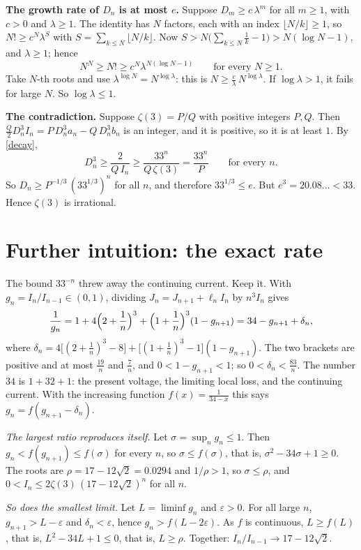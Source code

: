 \documentclass[11pt]{article}
\newcommand{\q}[1]{\medskip\noindent\textbf{#1}}
\begin{document}
\q{The growth rate of $D_n$ is at most $e$.} Suppose $D_m\ge c\,\lambda^m$ for all $m\ge1$, with
$c>0$ and $\lambda\ge1$. The identity has $N$ factors, each with an index $\lfloor N/k\rfloor\ge1$, so
$N!\ge c^N\lambda^{S}$ with $S=\sum_{k\le N}\lfloor N/k\rfloor$. Now
$S>N\bigl(\sum_{k\le N}\frac1k-1\bigr)>N(\log N-1)$, and $\lambda\ge1$; hence
\[
N^N\ge N!\ge c^N\lambda^{N(\log N-1)}\qquad\text{for every }N\ge1 .
\]
Take $N$-th roots and use $\lambda^{\log N}=N^{\log\lambda}$: this is $N\ge\frac c\lambda\,N^{\log\lambda}$.
If $\log\lambda>1$, it fails for large $N$. So $\log\lambda\le1$.

\q{The contradiction.} Suppose $\zeta(3)=P/Q$ with positive integers $P,Q$. Then
$\frac Q2D_n^3I_n=P\,D_n^3a_n-Q\,D_n^3b_n$ is an integer, and it is positive, so it is at least $1$. By
\eqref{decay},
\[
D_n^3\ge\frac2{Q\,I_n}\ge\frac{33^n}{Q\,\zeta(3)}=\frac{33^n}P\qquad\text{for every }n .
\]
So $D_n\ge P^{-1/3}\,(33^{1/3})^n$ for all $n$, and therefore $33^{1/3}\le e$. But $e^3=20.08\ldots<33$.
Hence $\zeta(3)$ is irrational.

\section*{Further intuition: the exact rate}

The bound $33^{-n}$ threw away the continuing current. Keep it. With $g_n=I_n/I_{n-1}\in(0,1)$,
dividing $J_n=J_{n+1}+\ell_nI_n$ by $n^3I_n$ gives
\[
\frac1{g_n}=1+4\Bigl(2+\frac1n\Bigr)^3+\Bigl(1+\frac1n\Bigr)^3(1-g_{n+1})=34-g_{n+1}+\delta_n,
\]
where $\delta_n=4\bigl[(2+\frac1n)^3-8\bigr]+\bigl[(1+\frac1n)^3-1\bigr](1-g_{n+1})$. The two brackets
are positive and at most $\frac{19}n$ and $\frac7n$, and $0<1-g_{n+1}<1$; so $0<\delta_n<\frac{83}n$.
The number $34$ is $1+32+1$: the present voltage, the limiting local loss, and the continuing
current. With the increasing function $f(x)=\frac1{34-x}$ this says $g_n=f(g_{n+1}-\delta_n)$.

\emph{The largest ratio reproduces itself.} Let $\sigma=\sup_ng_n\le1$. Then
$g_n<f(g_{n+1})\le f(\sigma)$ for every $n$, so $\sigma\le f(\sigma)$, that is,
$\sigma^2-34\sigma+1\ge0$. The roots are $\rho=17-12\sqrt2=0.0294$ and $1/\rho>1$, so
$\sigma\le\rho$, and
$0<I_n\le2\zeta(3)\,(17-12\sqrt2)^n$ for all $n$.

\emph{So does the smallest limit.} Let $L=\liminf g_n$ and $\varepsilon>0$. For all large $n$,
$g_{n+1}>L-\varepsilon$ and $\delta_n<\varepsilon$, hence $g_n>f(L-2\varepsilon)$. As $f$ is continuous, $L\ge f(L)$,
that is, $L^2-34L+1\le0$, that is, $L\ge\rho$. Together: $I_n/I_{n-1}\to17-12\sqrt2$.
\end{document}
